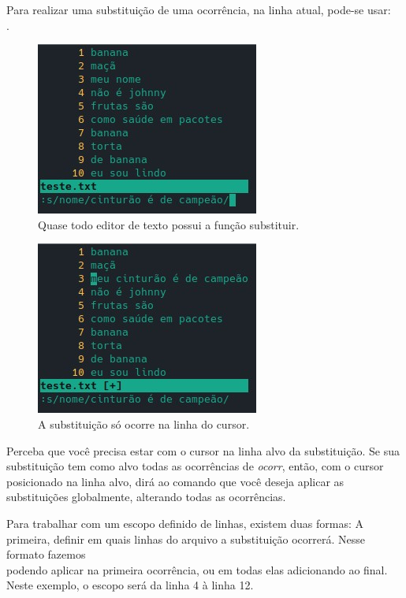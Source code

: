 Para realizar uma substituição de uma ocorrência, na linha atual, pode-se usar:\\
.

\begin{figure}[!htb]
\centering
\includegraphics[scale=1.20]{recursos_avancados/Substituicao_simples.jpg}
\caption{Quase todo editor de texto possui a função substituir.}
\end{figure}

\begin{figure}[!htb]
\centering
\includegraphics[scale=1.20]{recursos_avancados/Substituicao_simples_realizada.jpg}
\caption{A substituição só ocorre na linha do cursor.}
\end{figure}

Perceba que você precisa estar com o cursor na linha alvo da substituição.
Se sua substituição tem como alvo todas as ocorrências de \textit{ocorr}, então,
com o cursor posicionado na linha alvo,  dirá ao comando que
você deseja aplicar as substituições globalmente, alterando todas as ocorrências.

Para trabalhar com um escopo definido de linhas, existem duas formas: A primeira,
definir em quais linhas do arquivo a substituição ocorrerá.
Nesse formato fazemos \\
podendo aplicar na primeira ocorrência, ou em todas elas adicionando  ao final.
Neste exemplo, o escopo será da linha 4 à linha 12.

